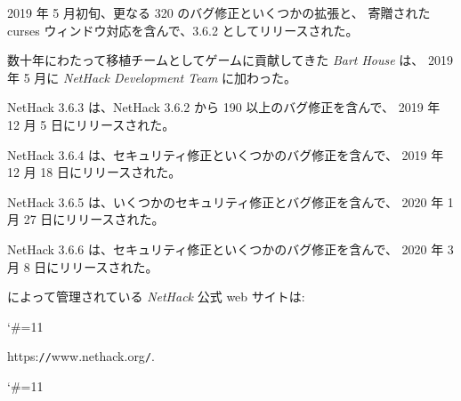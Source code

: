\medskip
2019 年 5 月初旬、更なる 320 のバグ修正といくつかの拡張と、
寄贈された curses ウィンドウ対応を含んで、3.6.2 としてリリースされた。

\medskip
数十年にわたって移植チームとしてゲームに貢献してきた {\it Bart House} は、
2019 年 5 月に {\it NetHack Development Team} に加わった。

\medskip
NetHack 3.6.3 は、NetHack 3.6.2 から 190 以上のバグ修正を含んで、
2019 年 12 月 5 日にリリースされた。

\medskip
NetHack 3.6.4 は、セキュリティ修正といくつかのバグ修正を含んで、
2019 年 12 月 18 日にリリースされた。

\medskip
NetHack 3.6.5 は、いくつかのセキュリティ修正とバグ修正を含んで、
2020 年 1 月 27 日にリリースされた。

\medskip
NetHack 3.6.6 は、セキュリティ修正といくつかのバグ修正を含んで、
2020 年 3 月 8 日にリリースされた。

\medskip
 によって管理されている {\it NetHack\/} 公式 web サイトは:
{\catcode`\#=11
}
https:{\tt /}{\tt /}www.nethack.org{\tt /}.
{\catcode`\#=11
}


